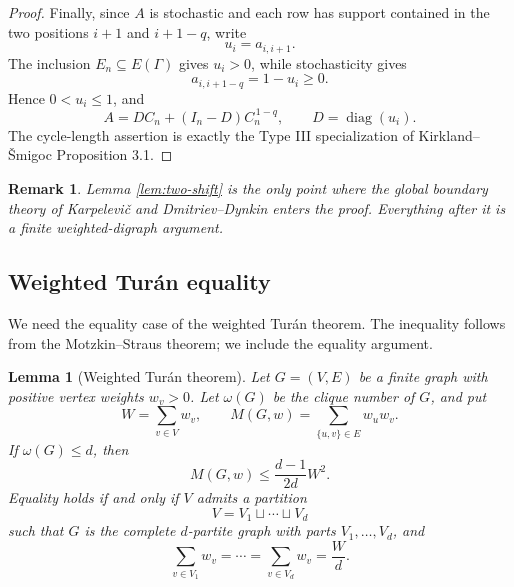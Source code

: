 \documentclass[11pt]{article}
\numberwithin{equation}{section}
\newtheorem{lemma}[theorem]{Lemma}
\newtheorem{remark}[theorem]{Remark}
\begin{document}
\begin{proof}
Finally, since $A$ is stochastic and each row has support contained in the
two positions $i+1$ and $i+1-q$, write
\[
        u_i=a_{i,i+1}.
\]
The inclusion $E_n\subseteq E(\Gamma)$ gives $u_i>0$, while stochasticity
gives
\[
        a_{i,i+1-q}=1-u_i\ge0.
\]
Hence $0<u_i\le1$, and
\[
        A=DC_n+(I_n-D)C_n^{\,1-q},
        \qquad D=\operatorname{diag}(u_i).
\]
The cycle-length assertion is exactly the Type III specialization of
Kirkland--\v{S}migoc Proposition 3.1.
\end{proof}

\begin{remark}
Lemma \ref{lem:two-shift} is the only point where the global boundary theory
of Karpelevi\v{c} and Dmitriev--Dynkin enters the proof. Everything after it
is a finite weighted-digraph argument.
\end{remark}

\subsection{Weighted Tur\'an equality}

We need the equality case of the weighted Tur\'an theorem. The inequality
follows from the Motzkin--Straus theorem; we include the equality argument.

\begin{lemma}[Weighted Tur\'an theorem]\label{lem:turan}
Let $G=(V,E)$ be a finite graph with positive vertex weights $w_v>0$.
Let $\omega(G)$ be the clique number of $G$, and put
\[
        W=\sum_{v\in V} w_v,
        \qquad
        M(G,w)=\sum_{\{u,v\}\in E} w_u w_v.
\]
If $\omega(G)\le d$, then
\[
        M(G,w)\le \frac{d-1}{2d}W^2.
\]
Equality holds if and only if $V$ admits a partition
\[
        V=V_1\sqcup\cdots\sqcup V_d
\]
such that $G$ is the complete $d$-partite graph with parts
$V_1,\ldots,V_d$, and
\[
        \sum_{v\in V_1}w_v=\cdots=\sum_{v\in V_d}w_v=\frac Wd.
\]
\end{lemma}
\end{document}
